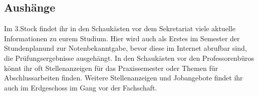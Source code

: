 \subsection{Aushänge}
Im 3.Stock findet ihr in den Schaukästen vor dem Sekretariat viele 
aktuelle Informationen zu eurem Studium. Hier wird auch als Erstes im 
Semester der Stundenplanund zur Notenbekanntgabe, bevor diese 
im Internet abrufbar sind, die Prüfungsergebnisse ausgehängt. In den 
Schaukästen vor den Professorenbüros könnt ihr oft Stellenanzeigen 
für das Praxissemester oder Themen für Abschlussarbeiten finden. 
Weitere Stellenanzeigen und Jobangebote findet ihr auch im 
Erdgeschoss im Gang vor der Fachschaft. 